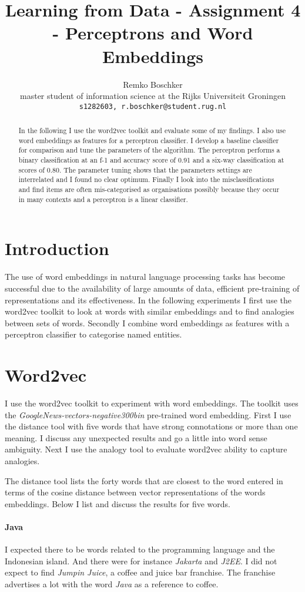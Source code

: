 \documentclass[11pt]{article}
\title{Learning from Data - Assignment 4 - Perceptrons and Word Embeddings}
\author{Remko Boschker \\
  master student of information science at the Rijks Universiteit Groningen \\
  {\tt s1282603, r.boschker@student.rug.nl} }
\date{}
\begin{document}
\maketitle
\begin{abstract}
In the following I use the word2vec toolkit and evaluate some of my findings. I also use word embeddings as features for a perceptron classifier. I develop a baseline classifier for comparison and tune the parameters of the algorithm. The perceptron performs a binary classification at an f-1 and accuracy score of 0.91 and a six-way classification at scores of 0.80. The parameter tuning shows that the parameters settings are interrelated and I found no clear optimum.  Finally I look into the misclassifications and find items are often mis-categorised as organisations possibly because they occur in many contexts and a perceptron is a linear classifier.
\end{abstract}

\section{Introduction}
The use of word embeddings in natural language processing tasks has become successful due to the availability of large amounts of data, efficient pre-training of representations and its effectiveness. In the following experiments I first use the word2vec toolkit to look at words with similar embeddings and to find analogies between sets of words. Secondly I combine word embeddings as features with a perceptron classifier to categorise named entities.

\section{Word2vec}

I use the word2vec toolkit to experiment with word embeddings. The toolkit uses the \emph{GoogleNews-vectors-negative300bin} pre-trained word embedding. First I use the distance tool with five words that have strong connotations or more than one meaning. I discuss any unexpected results and go a little into word sense ambiguity. Next I use the analogy tool to evaluate word2vec ability to capture analogies.

The distance tool lists the forty words that are closest to the word entered in terms of the cosine distance between vector representations of the words embeddings. Below I list and discuss the results for five words.

\paragraph{Java}
I expected there to be words related to the programming language and the Indonesian island. And there were for instance \emph{Jakarta} and \emph{J2EE}. I did not expect to find \emph{Jumpin Juice}, a coffee and juice bar franchise. The franchise advertises a lot with the word \emph{Java} as a reference to coffee.
\end{document}
